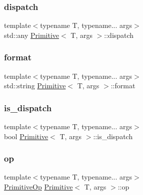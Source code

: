 \mbox{\label{struct_primitive_a8fe52297e3da666ec08e2328a3fe92e9}} 
\subsubsection{\texorpdfstring{dispatch}{dispatch}}
{\footnotesize\ttfamily template$<$typename T, typename... args$>$ \\
std\+::any \hyperlink{struct_primitive}{Primitive}$<$ T, args $>$\+::dispatch}

\mbox{\label{struct_primitive_afa8c2d4087b36ae9580fed3dc00e47b6}} 
\subsubsection{\texorpdfstring{format}{format}}
{\footnotesize\ttfamily template$<$typename T, typename... args$>$ \\
std\+::string \hyperlink{struct_primitive}{Primitive}$<$ T, args $>$\+::format}

\mbox{\label{struct_primitive_a599bf4b9b5115d99c203b51dc028ba4e}} 
\subsubsection{\texorpdfstring{is\+\_\+dispatch}{is\_dispatch}}
{\footnotesize\ttfamily template$<$typename T, typename... args$>$ \\
bool \hyperlink{struct_primitive}{Primitive}$<$ T, args $>$\+::is\+\_\+dispatch}

\mbox{\label{struct_primitive_a45ef953a37468a97b5a4b5531e5f21ce}} 
\subsubsection{\texorpdfstring{op}{op}}
{\footnotesize\ttfamily template$<$typename T, typename... args$>$ \\
\hyperlink{_instruction_8h_a227278394efd1e2313c727102db09ea9}{Primitive\+Op} \hyperlink{struct_primitive}{Primitive}$<$ T, args $>$\+::op}

